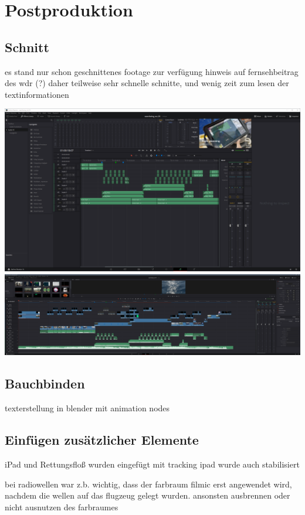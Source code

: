 \chapter{Postproduktion}

\section{Schnitt}

es stand nur schon geschnittenes footage zur verfügung
hinweis auf fernsehbeitrag des wdr (?)
daher teilweise sehr schnelle schnitte, und wenig zeit zum lesen der textinformationen

\includegraphics{gfx/post/resolve1.png}
\includegraphics{gfx/post/resolve2.png}

\section{Bauchbinden}

texterstellung in blender mit animation nodes

\section{Einfügen zusätzlicher Elemente}

iPad und Rettungsfloß wurden eingefügt mit tracking
ipad wurde auch stabilisiert

bei radiowellen war z.b. wichtig, dass der farbraum filmic erst angewendet wird, nachdem die wellen auf das flugzeug gelegt wurden. ansonsten ausbrennen oder nicht ausnutzen des farbraumes

